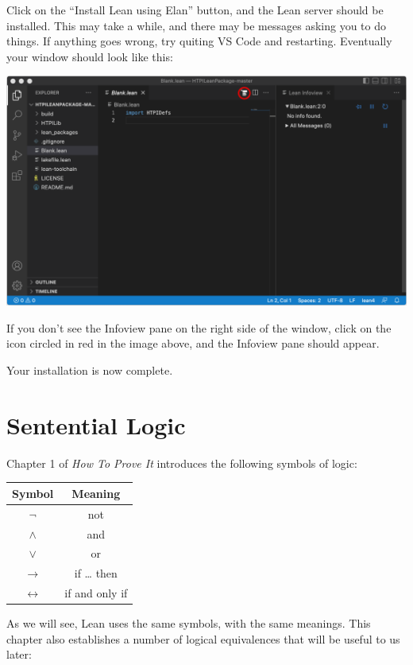 \documentclass[
  letterpaper,
  DIV=11,
  numbers=noendperiod]{scrreprt}
\theoremstyle{remark}
\begin{document}
Click on the ``Install Lean using Elan'' button, and the Lean server
should be installed. This may take a while, and there may be messages
asking you to do things. If anything goes wrong, try quiting VS Code and
restarting. Eventually your window should look like this:

\includegraphics{./Images/Ready.png}

If you don't see the Infoview pane on the right side of the window,
click on the icon circled in red in the image above, and the Infoview
pane should appear.

Your installation is now complete.


\hypertarget{sentential-logic}{%
\chapter{Sentential Logic}\label{sentential-logic}}

Chapter 1 of \emph{How To Prove It} introduces the following symbols of
logic:

\begin{longtable}[]{@{}cc@{}}
\toprule()
Symbol & Meaning \\
\midrule()
\endhead
\(\neg\) & not \\
\(\wedge\) & and \\
\(\vee\) & or \\
\(\to\) & if \ldots{} then \\
\(\leftrightarrow\) & if and only if \\
\bottomrule()
\end{longtable}

As we will see, Lean uses the same symbols, with the same meanings. This
chapter also establishes a number of logical equivalences that will be
useful to us later:
\end{document}
